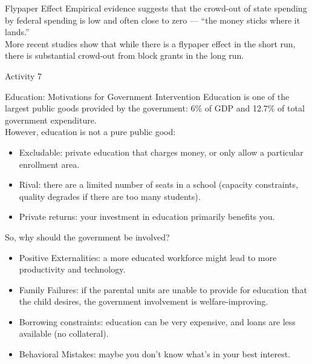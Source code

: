 \documentclass[10pt]{extarticle}
\begin{document}
  \begin{problem}{Flypaper Effect}
    Empirical evidence suggests that the crowd-out of state spending by federal spending is low and often close to zero --- ``the money sticks where it lands.''\\

    More recent studies show that while there is a flypaper effect in the short run, there is substantial crowd-out from block grants in the long run.
  \end{problem}
  \begin{problem}{Activity 7}
    \begin{tcbraster}[raster columns = 1,colframe = black!75!white,colback=white]
    \end{tcbraster}
  \end{problem}
  \begin{problem}{Education: Motivations for Government Intervention}
    Education is one of the largest public goods provided by the government: 6\% of GDP and 12.7\% of total government expenditure.\\

    However, education is not a pure public good:
    \begin{itemize}
      \item Excludable: private education that charges money, or only allow a particular enrollment area.
      \item Rival: there are a limited number of seats in a school (capacity constraints, quality degrades if there are too many students).
      \item Private returns: your investment in education primarily benefits you.
    \end{itemize}
    So, why should the government be involved?
    \begin{itemize}
      \item Positive Externalities: a more educated workforce might lead to more productivity and technology.
      \item Family Failures: if the parental units are unable to provide for education that the child desires, the government involvement is welfare-improving.
      \item Borrowing constraints: education can be very expensive, and loans are less available (no collateral).
      \item Behavioral Mistakes: maybe you don't know what's in your best interest.
    \end{itemize}
  \end{problem}
\end{document}
